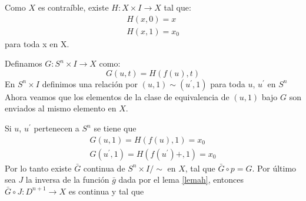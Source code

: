 \begin{Dem}

Como $X$ es contraíble, existe $H\colon X\times I \rightarrow X$ tal que:
\begin{eqnarray}
H(x,0)=x \\
H(x,1) = x_0
\end{eqnarray}
para toda x en X.

Definamos $G\colon S^n\times I \rightarrow X$ como:
\begin{equation}
G(u,t) = H(f(u),t)
\end{equation}
En $S^n\times I$ definimos una relación por $(u,1)\sim(u^{'},1)$ para toda $u$, $u^{'}$ en $S^n$
Ahora veamos que los elementos de la clase de equivalencia de $(u,1)$ bajo $G$ son enviados al mismo elemento en $X$.

Si $u$, $u^{'}$ pertenecen a $S^n$ se tiene que
\begin{eqnarray}
G(u,1) = H(f(u),1) = x_0\\
G(u^{'},1)=H(f(u^{'})+,1) = x_0
\end{eqnarray}
Por lo tanto existe $\bar{G}$ continua de $S^n\times I /{\sim}$ en $X$, tal que $\bar{G}\circ p = G$.
Por último sea $J$ la inversa de la función  $\bar{g}$ dada por el lema \ref{lemah}, entonces $\bar{G}\circ J \colon D^{n+1}\rightarrow X$ es continua y tal que 
\end{Dem}

